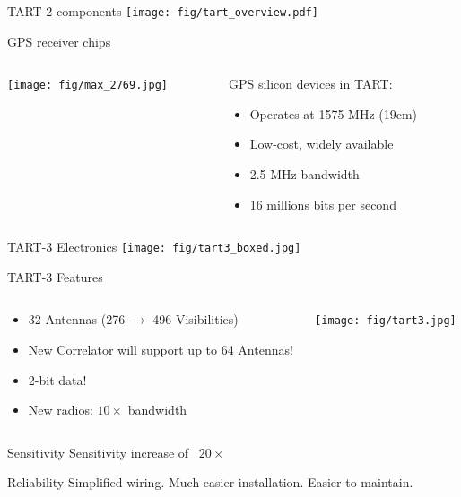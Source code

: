 \documentclass[ignorenonframetext]{beamer}
\begin{document}
 
\begin{frame}{TART-2 components}
  \texttt{[image: fig/tart\_overview.pdf]}
\end{frame}



\begin{frame}{GPS receiver chips}
 \begin{columns}
  \begin{column}{0.5\linewidth}
    \texttt{[image: fig/max\_2769.jpg]}
  \end{column}
  \begin{column}{0.4\linewidth}
  GPS silicon devices in TART:
\begin{itemize}
 \item Operates at 1575 MHz (19cm)
 \item Low-cost, widely available
 \item 2.5 MHz bandwidth
 \item 16 millions bits per second
\end{itemize}
  \end{column}
  \end{columns}
\end{frame}



\begin{frame}{TART-3 Electronics}
 \texttt{[image: fig/tart3\_boxed.jpg]}
\end{frame}

\begin{frame}{TART-3 Features}
 \begin{columns}
  \begin{column}{0.4\linewidth}
    \begin{itemize}
    \item 32-Antennas (276 $\rightarrow$ 496 Visibilities)
    \item New Correlator will support up to 64 Antennas!
    \item 2-bit data!
    \item New radios: $10 \times$ bandwidth
    \end{itemize}
  \end{column}
  \begin{column}{0.6\linewidth}
    \texttt{[image: fig/tart3.jpg]}
  \end{column}
\end{columns}
\pause
    \begin{block}{Sensitivity}
Sensitivity increase of ~$20 \times$
    \end{block}
    \begin{block}{Reliability}
Simplified wiring. Much easier installation. Easier to maintain.
    \end{block}
\end{frame}
\end{document}
